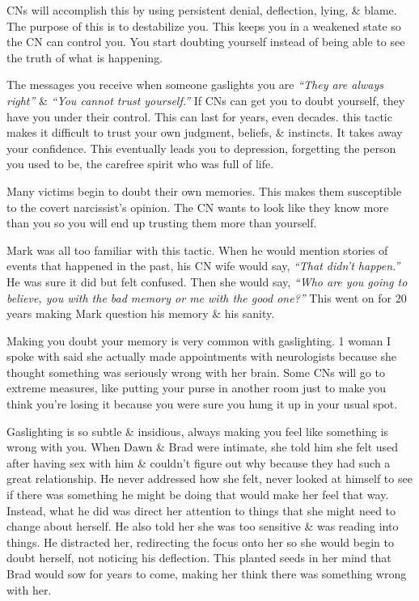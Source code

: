 \documentclass{article}
\numberwithin{equation}{section}
\begin{document}
CNs will accomplish this by using persistent denial, deflection, lying, \& blame. The purpose of this is to destabilize you. This keeps you in a weakened state so the CN can control you. You start doubting yourself instead of being able to see the truth of what is happening.

The messages you receive when someone gaslights you are \textit{``They are always right''} \& \textit{``You cannot trust yourself.''} If CNs can get you to doubt yourself, they have you under their control. This can last for years, even decades. this tactic makes it difficult to trust your own judgment, beliefs, \& instincts. It takes away your confidence. This eventually leads you to depression, forgetting the person you used to be, the carefree spirit who was full of life.

Many victims begin to doubt their own memories. This makes them susceptible to the covert narcissist's opinion. The CN wants to look like they know more than you so you will end up trusting them more than yourself.

Mark was all too familiar with this tactic. When he would mention stories of events that happened in the past, his CN wife would say, \textit{``That didn't happen.''} He was sure it did but felt confused. Then she would say, \textit{``Who are you going to believe, you with the bad memory or me with the good one?''} This went on for 20 years making Mark question his memory \& his sanity.

Making you doubt your memory is very common with gaslighting. 1 woman I spoke with said she actually made appointments with neurologists because she thought something was seriously wrong with her brain. Some CNs will go to extreme measures, like putting your purse in another room just to make you think you're losing it because you were sure you hung it up in your usual spot.

Gaslighting is so subtle \& insidious, always making you feel like something is wrong with you. When Dawn \& Brad were intimate, she told him she felt used after having sex with him \& couldn't figure out why because they had such a great relationship. He never addressed how she felt, never looked at himself to see if there was something he might be doing that would make her feel that way. Instead, what he did was direct her attention to things that she might need to change about herself. He also told her she was too sensitive \& was reading into things. He distracted her, redirecting the focus onto her so she would begin to doubt herself, not noticing his deflection. This planted seeds in her mind that Brad would sow for years to come, making her think there was something wrong with her.
\end{document}

